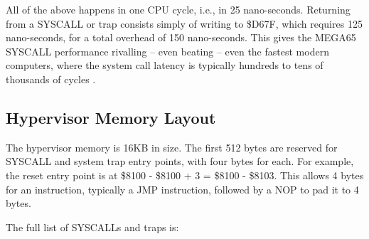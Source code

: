 All of the above happens in one CPU cycle, i.e., in 25 nano-seconds.
Returning from a SYSCALL or trap consists simply of writing to \$D67F, which
requires 125 nano-seconds, for a total overhead of 150 nano-seconds.
This gives the MEGA65 SYSCALL performance rivalling -- even beating
-- even the fastest modern computers, where the system call latency is
typically hundreds to tens of thousands of cycles \cite{soares2010flexsc}.

\subsection{Hypervisor Memory Layout}

The hypervisor memory is 16KB in size.  The first 512 bytes are
reserved for SYSCALL and system trap entry
points, with four bytes for each.  For example, the reset entry point is
at \$8100 - \$8100 + 3 = \$8100 - \$8103.
This allows 4 bytes for an instruction, typically a JMP instruction,
followed by a NOP to pad it to 4 bytes.

The full list of SYSCALLs and traps is:

